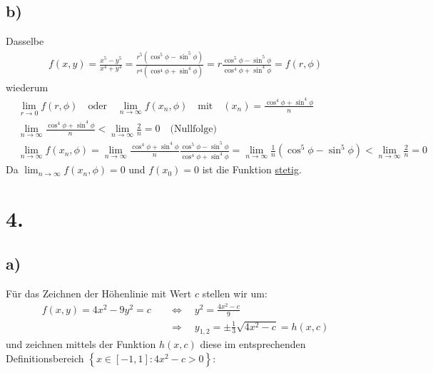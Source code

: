\documentclass[11pt,a4paper]{article}
\newcommand{\1}    	{\mathbbm{1}}
\begin{document}
	\subsection*{b)}
	Dasselbe
	\begin{align*}
		f(x,y) = \frac{x^5 - y^5}{x^4 + y^4} = \frac{r^5 ( \cos^5 \phi - \sin^5 \phi )}{r^4 ( \cos^4 \phi + \sin^4 \phi) } = r \frac{\cos^5 \phi - \sin^5 \phi}{\cos^4 \phi + \sin^4 \phi} = f(r,\phi)
	\end{align*}
	wiederum
	\begin{align*}
		& \lim_{r \rightarrow 0} f(r,\phi) \quad\textrm{oder}\quad
		\lim_{n \rightarrow \infty} f\left( x_n,\phi \right) \quad\textrm{mit}\quad
		(x_n) = \frac{\cos^4 \phi + \sin^4 \phi}{n} \\
		& \lim_{n \rightarrow \infty} \frac{\cos^4 \phi + \sin^4 \phi}{n} < \lim_{n \rightarrow \infty} \frac{2}{n} = 0 \quad \textrm{(Nullfolge)} \\
		& \lim_{n \rightarrow \infty} f\left( x_n,\phi \right)  = 
		\lim_{n \rightarrow \infty} \frac{\cos^4 \phi + \sin^4 \phi}{n} \frac{\cos^5 \phi - \sin^5 \phi}{\cos^4 \phi + \sin^4 \phi} = 
		\lim_{n \rightarrow \infty} \frac{1}{n} (\cos^5 \phi - \sin^5 \phi) < \lim_{n \rightarrow \infty} \frac{2}{n} = 0
	\end{align*}
	Da \( \lim_{n \rightarrow \infty} f\left( x_n,\phi \right) = 0\) und \(f( x_0) = 0\) ist die Funktion \underline{stetig}.
	
	\section*{4.}
	\subsection*{a)}
	Für das Zeichnen der Höhenlinie mit Wert \(c\) stellen wir um:
	\begin{align*}
		f(x,y) = 4x^2 - 9y^2 = c \quad &\Leftrightarrow \quad y^2 = \frac{4x^2 - c}{9} \\
		&\Rightarrow \quad y_{1,2} = \pm \frac{1}{3} \sqrt{4x^2 - c} = h(x,c)
	\end{align*}
	und zeichnen mittels der Funktion \(h(x,c)\) diese im entsprechenden Definitionsbereich \(\left\{ x \in \left[ -1, 1 \right] : 4x^2 - c > 0 \right\} \):
	
\end{document}
